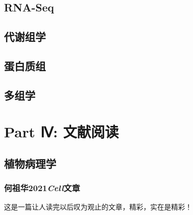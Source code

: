 \documentclass[
  10pt,
]{book}
\begin{document}
\hypertarget{rnaseq}{%
\chapter{RNA-Seq}\label{rnaseq}}

\hypertarget{meta}{%
\chapter{代谢组学}\label{meta}}

\hypertarget{pro}{%
\chapter{蛋白质组}\label{pro}}

\hypertarget{multi}{%
\chapter{多组学}\label{multi}}

\hypertarget{part-part-ux2173-ux6587ux732eux9605ux8bfb}{%
\part*{Part Ⅳ: 文献阅读}\label{part-part-ux2173-ux6587ux732eux9605ux8bfb}}

\hypertarget{patho}{%
\chapter{植物病理学}\label{patho}}

\hypertarget{ux4f55ux7956ux534e2021cellux6587ux7ae0}{%
\section{\texorpdfstring{何祖华2021\emph{Cell}文章}{何祖华2021Cell文章}}\label{ux4f55ux7956ux534e2021cellux6587ux7ae0}}

这是一篇让人读完以后叹为观止的文章\autocite{gao2021ca2:Cell}，精彩，实在是精彩！
\end{document}
